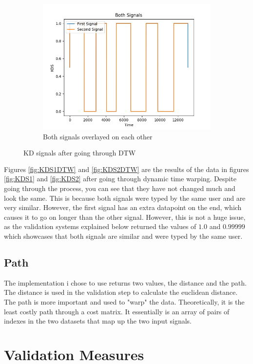 \documentclass[10pt,a4paper]{report}
\begin{document}
\begin{figure}
\begin{subfigure}[b]{0.3\textwidth}
		\includegraphics[width=\textwidth]{KDSBothDTW}
		\caption{Both signals overlayed on each other}
		\label{fig:KDSBothDTW}
	\end{subfigure}
	\caption{KD signals after going through DTW}
	\label{fig:KDSDTW}
\end{figure}

Figures \ref{fig:KDS1DTW} and \ref{fig:KDS2DTW} are the results of the data in figures \ref{fig:KDS1} and \ref{fig:KDS2} after going through dynamic time warping. Despite going through the process, you can see that they have not changed much and look the same. This is because both signals were typed by the same user and are very similar. However, the first signal has an extra datapoint on the end, which causes it to go on longer than the other signal. However, this is not a huge issue, as the validation systems explained below returned the values of \(1.0\) and \(0.99999\) which showcases that both signals are similar and were typed by the same user.

\subsection{Path}
The implementation i chose to use returns two values, the distance and the path. The distance is used in the validation step to calculate the euclidean distance. The path is more important and used to "warp" the data. Theoretically, it is the least costly path through a cost matrix. It essentially is an array of pairs of indexes in the two datasets that map up the two input signals.

\section{Validation Measures}
\end{document}
